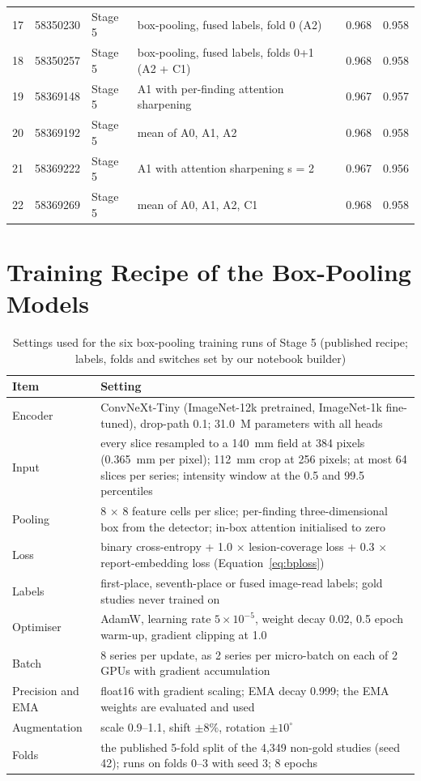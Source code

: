 \begin{longtable}{C{0.6cm}C{1.5cm}L{2.2cm}L{6.9cm}C{1.1cm}C{1.1cm}}
17 & 58350230 & Stage 5 & box-pooling, fused labels, fold 0 (A2) & 0.968 & 0.958 \\
18 & 58350257 & Stage 5 & box-pooling, fused labels, folds 0+1 (A2 + C1) & 0.968 & 0.958 \\
19 & 58369148 & Stage 5 & A1 with per-finding attention sharpening & 0.967 & 0.957 \\
20 & 58369192 & Stage 5 & mean of A0, A1, A2 & 0.968 & 0.958 \\
21 & 58369222 & Stage 5 & A1 with attention sharpening s = 2 & 0.967 & 0.956 \\
22 & 58369269 & Stage 5 & mean of A0, A1, A2, C1 & 0.968 & 0.958 \\
\bottomrule
\end{longtable}

\section{Training Recipe of the Box-Pooling Models}

\begin{table}[H]
\centering\footnotesize{}
\caption[Training settings of the box-pooling models]{Settings used for the six box-pooling training runs of Stage 5 (published recipe; labels, folds and switches set by our notebook builder)}
\label{tab:bprecipe}
\begin{tabularx}{\textwidth}{L{4.0cm} Y}
\toprule
Item & Setting \\
\midrule
Encoder & ConvNeXt-Tiny (ImageNet-12k pretrained, ImageNet-1k fine-tuned), drop-path 0.1; 31.0~M parameters with all heads \\
Input & every slice resampled to a 140~mm field at 384 pixels (0.365~mm per pixel); 112~mm crop at 256 pixels; at most 64 slices per series; intensity window at the 0.5 and 99.5 percentiles \\
Pooling & 8 $\times$ 8 feature cells per slice; per-finding three-dimensional box from the detector; in-box attention initialised to zero \\
Loss & binary cross-entropy + 1.0 $\times$ lesion-coverage loss + 0.3 $\times$ report-embedding loss (Equation~\ref{eq:bploss}) \\
Labels & first-place, seventh-place or fused image-read labels; gold studies never trained on \\
Optimiser & AdamW, learning rate $5\times10^{-5}$, weight decay 0.02, 0.5 epoch warm-up, gradient clipping at 1.0 \\
Batch & 8 series per update, as 2 series per micro-batch on each of 2 GPUs with gradient accumulation \\
Precision and EMA & float16 with gradient scaling; EMA decay 0.999; the EMA weights are evaluated and used \\
Augmentation & scale 0.9--1.1, shift $\pm8\%$, rotation $\pm10^\circ$ \\
Folds & the published 5-fold split of the 4,349 non-gold studies (seed 42); runs on folds 0--3 with seed 3; 8 epochs \\
\bottomrule
\end{tabularx}
\end{table}

